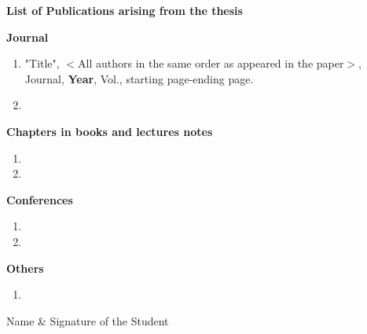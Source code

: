 \begin{center}
{\bf List of Publications arising from the thesis}
\end{center}

{\bf Journal }
\begin{enumerate}
    \item "Title", $<$All authors in the same order as appeared in the paper$>$, Journal, \textbf{Year}, Vol., starting page-ending page. 
    \item 
\end{enumerate}

{\bf Chapters in books and lectures notes}
\begin{enumerate}
    \item 
    \item 
\end{enumerate}

{\bf Conferences}
\begin{enumerate}
    \item 
    \item 
\end{enumerate}

{\bf Others}
\begin{enumerate}
    \item 
\end{enumerate}

\vskip1.0in

\hspace*{3.5in} {Name \& Signature of the Student} \\